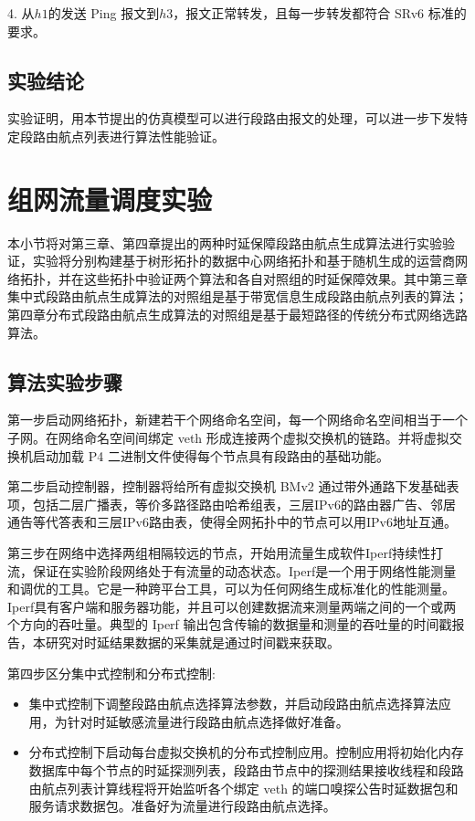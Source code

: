 4. 从$h1$的发送 \gls*{Ping} 报文到$h3$，报文正常转发，且每一步转发都符合 \gls*{SRv6} \cite{SRARK} 标准的要求。

\subsection{实验结论}

实验证明，用本节提出的仿真模型可以进行段路由报文的处理，可以进一步下发特定段路由航点列表进行算法性能验证。

\section{组网流量调度实验}

本小节将对第三章、第四章提出的两种时延保障段路由航点生成算法进行实验验证，实验将分别构建基于树形拓扑的数据中心网络拓扑和基于随机生成的运营商网络拓扑，并在这些拓扑中验证两个算法和各自对照组的时延保障效果。其中第三章集中式段路由航点生成算法的对照组是基于带宽信息生成段路由航点列表的算法；第四章分布式段路由航点生成算法的对照组是基于最短路径的传统分布式网络选路算法。

\subsection{算法实验步骤}

第一步启动网络拓扑，新建若干个网络命名空间，每一个网络命名空间相当于一个子网。在网络命名空间间绑定 \gls*{veth} 形成连接两个虚拟交换机的链路。并将虚拟交换机启动加载 \gls*{P4} 二进制文件使得每个节点具有段路由的基础功能。

第二步启动控制器，控制器将给所有虚拟交换机 \gls*{BMv2} 通过带外通路下发基础表项，包括二层广播表，等价多路径路由哈希组表，三层IPv6的路由器广告、邻居通告等代答表和三层IPv6路由表，使得全网拓扑中的节点可以用IPv6地址互通。

第三步在网络中选择两组相隔较远的节点，开始用流量生成软件Iperf持续性打流，保证在实验阶段网络处于有流量的动态状态。Iperf是一个用于网络性能测量和调优的工具。它是一种跨平台工具，可以为任何网络生成标准化的性能测量。Iperf具有客户端和服务器功能，并且可以创建数据流来测量两端之间的一个或两个方向的吞吐量。典型的 Iperf 输出包含传输的数据量和测量的吞吐量的时间戳报告，本研究对时延结果数据的采集就是通过时间戳来获取。

第四步区分集中式控制和分布式控制:

\begin{itemize}
\item 集中式控制下调整段路由航点选择算法参数，并启动段路由航点选择算法应用，为针对时延敏感流量进行段路由航点选择做好准备。
\item 分布式控制下启动每台虚拟交换机的分布式控制应用。控制应用将初始化内存数据库中每个节点的时延探测列表，段路由节点中的探测结果接收线程和段路由航点列表计算线程将开始监听各个绑定 \gls*{veth} 的端口嗅探公告时延数据包和服务请求数据包。准备好为流量进行段路由航点选择。
\end{itemize}

